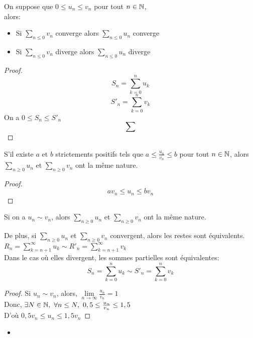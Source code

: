\documentclass[../main.tex]{subfile}
\begin{document}
\begin{theo}
	On suppose que $0 \leq u_n \leq v_n$ pour tout $n \in \mathbb{N}$, \\
	alors:
\begin{itemize}	
	\item Si $\sum_{n \leq 0}v_n$ converge alors $\sum\limits_{n \leq 0} u_n$ converge
	\item Si $\sum_{n \leq 0}v_n$ diverge alors $\sum\limits_{n \leq 0} u_n$ diverge
\end{itemize}
\end{theo}

\begin{proof}
	$$S_n = \sum\limits_{k=0}^n u_k$$
	$$S'_n = \sum\limits_{k=0}^n v_k$$
	On a $0 \leq S_n \leq S'_n$\\
	$$\sum$$
\end{proof}

\begin{corrol}
	S'il existe $a$ et $b$ strictements positifs tels que $a \leq \frac{u_n}{v_n} \leq b$ pour tout $n \in \mathbb{N}$, 
	alors $\sum\limits_{n \geq 0} u_n$ et $\sum\limits_{n \geq 0} v_n$ ont la même nature.
\end{corrol}

\begin{proof}
	$$av_n \leq u_n \leq bv_n$$
\end{proof}

\begin{corrol}
	Si on a $u_n \sim v_n$, alors $\sum\limits_{n \geq 0} u_n$ et $\sum\limits_{n \geq 0} v_n$ ont la même nature.

	De plus, si $\sum\limits_{n \geq 0} u_n$ et $\sum\limits_{n \geq 0} v_n$ convergent, alors les restes sont équivalents.\\
	$R_n = \sum\limits_{k = n + 1}^\infty u_k \sim R'_n = \sum\limits_{k = n+1}^\infty v_k$\\
	Dans le cas où elles divergent, les sommes partielles sont équivalentes:
	$$S_n = \sum\limits_{k=0}^n u_k \sim S'_n = \sum\limits_{k=0}^n v_k$$
\end{corrol}

\begin{proof}
	Si $u_n \sim v_n$, alors, $\lim\limits_{n \to \infty} \frac{u_n}{v_n} = 1$\\
	Donc, $\exists N \in \mathbb{N}, \ \forall n \leq N, \ 0,5 \leq \frac{u_n}{v_n} \leq 1,5$\\
	D'où $0,5 v_n \leq u_n \leq 1,5 v_n$
\end{proof}











\begin{ex}
\begin{itemize}	
	\item 
\end{itemize}
\end{ex}
\end{document}
